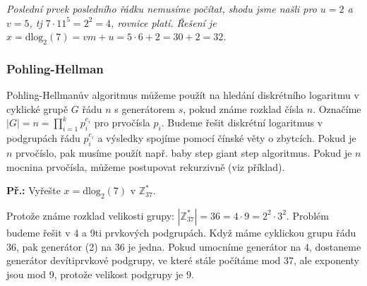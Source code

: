 \documentclass[10pt,a4paper]{article}
\begin{document}
\textit{Poslední prvek posledního řádku nemusíme počítat, shodu jsme našli pro $u=2$ a $v=5$, tj $7\cdot 11^5 = 2^2 = 4$, rovnice platí. Řešení je $x = \text{dlog}_2 (7) = vm + u = 5\cdot6 + 2 = 30 + 2 = 32$. }

\subsubsection{Pohling-Hellman}
Pohling-Hellmanův algoritmus můžeme použít na hledání diskrétního logaritmu v cyklické grupě $G$ řádu $n$ s generátorem $s$, pokud známe rozklad čísla $n$. Označíme $|G| = n = \prod_{i=1}^k p_i^{e_i}$ pro prvočísla $p_i$.  Budeme řešit diskrétní logaritmus v podgrupách řádu $p_i^{e_i}$ a výsledky spojíme pomocí čínské věty o zbytcích. Pokud je $n$ prvočíslo, pak musíme použít např. baby step giant step algoritmus. Pokud je $n$ mocnina prvočísla, můžeme postupovat rekurzivně (viz příklad).

\textbf{Př.:} Vyřešte $x = \text{dlog}_2 (7)$ v $\mathbb{Z}_{37}^*$.

Protože známe rozklad velikosti grupy: $|\mathbb{Z}_{37}^*| = 36 = 4 \cdot 9 = 2^2 \cdot 3^2$. Problém budeme řešit v 4 a 9ti prvkových podgrupách. Když máme cyklickou grupu řádu 36, pak generátor (2) na 36 je jedna. Pokud umocníme generátor na 4, dostaneme generátor devítiprvkové podgrupy, ve které stále počítáme mod 37, ale exponenty jsou mod 9, protože velikost podgrupy je 9.
\end{document}
